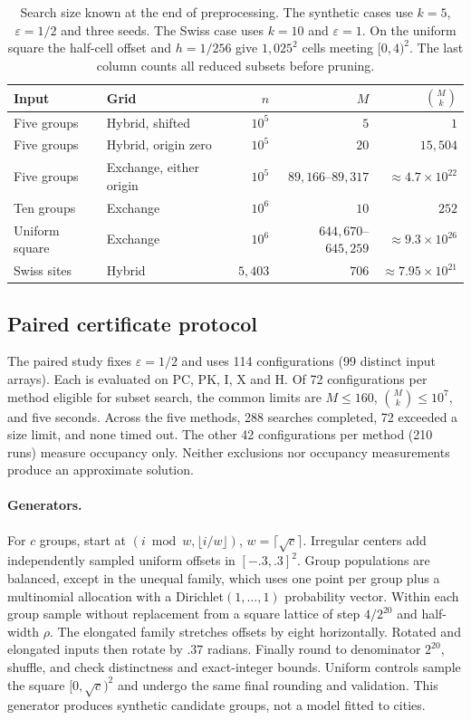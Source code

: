 \documentclass[a4paper,12pt]{article}
\numberwithin{equation}{section}
\begin{document}
\begin{table}[htbp]\centering\small
\caption{Search size known at the end of preprocessing. The synthetic cases use $k=5$, $\varepsilon=1/2$ and three seeds. The Swiss case uses $k=10$ and $\varepsilon=1$. On the uniform square the half-cell offset and $h=1/256$ give $1{,}025^2$ cells meeting $[0,4)^2$. The last column counts all reduced subsets before pruning.}\label{tab:occupancy-budget}
\begin{tabular}{@{}llrrr@{}}\toprule
Input & Grid & $n$ & $M$ & $\binom Mk$\\\midrule
Five groups & Hybrid, shifted & $10^5$ & $5$ & $1$\\
Five groups & Hybrid, origin zero & $10^5$ & $20$ & $15{,}504$\\
Five groups & Exchange, either origin & $10^5$ & $89{,}166$--$89{,}317$ & $\approx4.7\times10^{22}$\\
Ten groups & Exchange & $10^6$ & $10$ & $252$\\
Uniform square & Exchange & $10^6$ & $644{,}670$--$645{,}259$ & $\approx9.3\times10^{26}$\\
Swiss sites & Hybrid & $5{,}403$ & $706$ & $\approx7.95\times10^{21}$\\\bottomrule
\end{tabular}\end{table}

\subsection{Paired certificate protocol}
The paired study fixes $\varepsilon=1/2$ and uses 114 configurations (99 distinct input arrays).
Each is evaluated on PC, PK, I, X and H. Of 72 configurations per method eligible for subset
search, the common limits are $M\le160$, $\binom Mk\le10^7$, and five seconds. Across the five
methods, 288 searches completed, 72 exceeded a size limit, and none timed out. The other 42
configurations per method (210 runs) measure occupancy only. Neither exclusions nor occupancy
measurements produce an approximate solution.

\paragraph{Generators.}
For $c$ groups, start at $(i\bmod w,\lfloor i/w\rfloor)$, $w=\lceil\sqrt c\rceil$. Irregular
centers add independently sampled uniform offsets in $[-.3,.3]^2$. Group populations are balanced,
except in the unequal family, which uses one point per group plus a multinomial allocation with a
Dirichlet$(1,\ldots,1)$ probability vector. Within each group sample without replacement from a
square lattice of step $4/2^{20}$ and half-width $\rho$. The elongated family stretches offsets by
eight horizontally. Rotated and elongated inputs then rotate by $.37$ radians. Finally round to
denominator $2^{20}$, shuffle, and check distinctness and exact-integer bounds. Uniform controls
sample the square $[0,\sqrt c)^2$ and undergo the same final rounding and validation. This
generator produces synthetic candidate groups, not a model fitted to cities.
\end{document}
